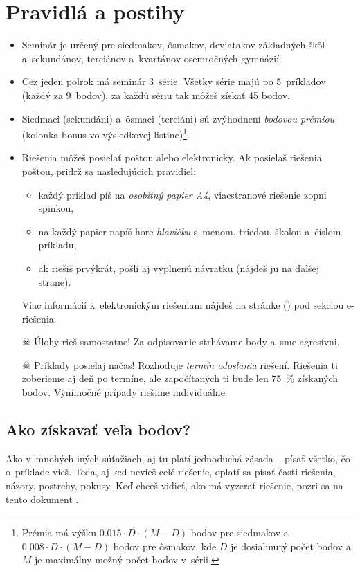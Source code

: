 \pagestyle{rules}

\section{Pravidlá a postihy}
\begin{itemize}
	\item Seminár je určený pre siedmakov, ôsmakov, deviatakov základných škôl a~sekundánov, terciánov a~kvartánov osemročných gymnázií. 

	\item Cez jeden polrok má seminár 3~série. Všetky série majú po 5~príkladov (každý za 9~bodov), za každú sériu tak môžeš získať 45 bodov.

	\item Siedmaci (sekundáni) a~ôsmaci (terciáni) sú zvýhodnení \emph{bodovou prémiou} (kolonka bonus vo výsledkovej listine)\footnote{%
		Prémia má výšku $\num{0.015} \cdot D \cdot (M - D)$ bodov pre siedmakov a $\num{0.008} \cdot D \cdot (M - D)$ bodov pre ôsmakov,
		kde $D$ je dosiahnutý počet bodov a $M$ je maximálny možný počet bodov v~sérii.}.

	\item Riešenia môžeš posielať poštou alebo elektronicky. Ak posielaš riešenia poštou, pridrž sa nasledujúcich pravidiel:
		\begin{itemize}
			\item každý príklad píš na \emph{osobitný papier A4}, viacstranové riešenie zopni spinkou,
			\item na každý papier napíš hore \emph{hlavičku} s~menom, triedou, školou a~číslom príkladu,
			\item ak riešiš prvýkrát, pošli aj vyplnenú návratku (nájdeš ju na ďalšej strane).
		\end{itemize}
	Viac informácií k~elektronickým riešeniam nájdeš na stránke (\URL{\seminarURL}) pod sekciou e-riešenia.

	\item[$\skull$] Úlohy rieš samostatne! Za odpisovanie strhávame body a~sme agresívni. 

	\item[$\skull$] Príklady posielaj načas! Rozhoduje \emph{termín odoslania} riešení. Riešenia ti zoberieme aj deň po termíne, ale započítaných ti bude len \SI{75}{\percent} získaných bodov.
		Výnimočné prípady riešime individuálne.
\end{itemize}

\subsection{Ako získavať veľa bodov?}
	Ako v~mnohých iných súťažiach, aj tu platí jednoduchá zásada -- písať všetko, čo o~príklade vieš. Teda, aj keď nevieš celé riešenie, oplatí sa písať časti
	riešenia, názory, postrehy, pokusy. Keď chceš vidieť, ako má vyzerať riešenie, pozri sa na tento dokument .

